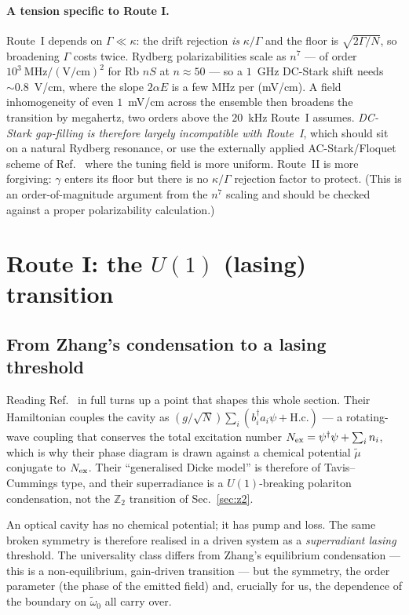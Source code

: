 \documentclass[11pt,a4paper]{article}
\newcommand{\dg}{^{\dagger}}
\newcommand{\wt}{\tilde{\omega}_{0}}
\begin{document}
\paragraph{A tension specific to Route I.} Route~I depends on $\Gamma\ll\kappa$: the drift
rejection \emph{is} $\kappa/\Gamma$ and the floor is $\sqrt{2\Gamma/N}$, so broadening
$\Gamma$ costs twice. Rydberg polarizabilities scale as $n^7$ --- of order
$10^3~\mathrm{MHz/(V/cm)^2}$ for Rb $nS$ at $n\approx50$ --- so a $1$~GHz DC-Stark shift needs
$\sim0.8$~V/cm, where the slope $2\alpha E$ is a few MHz per (mV/cm). A field inhomogeneity of
even $1$~mV/cm across the ensemble then broadens the transition by megahertz, two orders above
the $20$~kHz Route~I assumes. \emph{DC-Stark gap-filling is therefore largely incompatible
with Route~I}, which should sit on a natural Rydberg resonance, or use the externally applied
AC-Stark/Floquet scheme of Ref.~\cite{Floquet2024} where the tuning field is more uniform.
Route~II is more forgiving: $\gamma$ enters its floor but there is no $\kappa/\Gamma$
rejection factor to protect. (This is an order-of-magnitude argument from the $n^7$ scaling
and should be checked against a proper polarizability calculation.)

\section{Route I: the $U(1)$ (lasing) transition}
\label{sec:u1}

\subsection{From Zhang's condensation to a lasing threshold}

Reading Ref.~\cite{Zhang2013} in full turns up a point that shapes this whole section. Their
Hamiltonian couples the cavity as $(g/\sqrt N)\sum_i(b_i^\dagger a_i\psi+\mathrm{H.c.})$ --- a
rotating-wave coupling that conserves the total excitation number
$N_{\rm ex}=\psi\dg\psi+\sum_i n_i$, which is why their phase diagram is drawn against a
chemical potential $\tilde\mu$ conjugate to $N_{\rm ex}$. Their ``generalised Dicke model'' is
therefore of Tavis--Cummings type, and their superradiance is a $U(1)$-breaking polariton
condensation, not the $\mathbb{Z}_2$ transition of Sec.~\ref{sec:z2}.

An optical cavity has no chemical potential; it has pump and loss. The same broken symmetry is
therefore realised in a driven system as a \emph{superradiant lasing} threshold. The
universality class differs from Zhang's equilibrium condensation --- this is a
non-equilibrium, gain-driven transition --- but the symmetry, the order parameter (the phase
of the emitted field) and, crucially for us, the dependence of the boundary on $\wt$ all
carry over.
\end{document}
